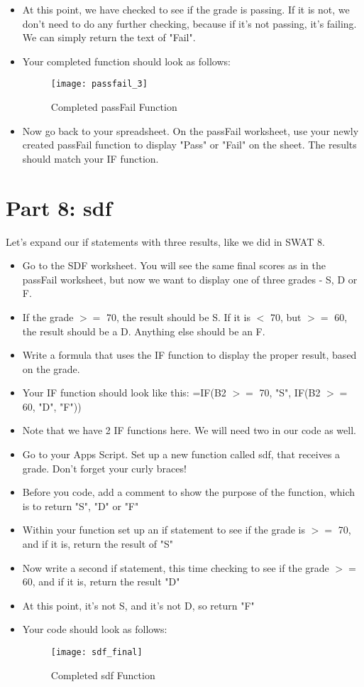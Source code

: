 \documentclass{article}
\begin{document}
\begin{itemize}
\item At this point, we have checked to see if the grade is passing.  If it is not, we don't need to do any further checking, because if it's not passing, it's failing.  We can simply return the text of "Fail".
  \item Your completed function should look as follows:
  \begin{figure}[H]
  \centering
  \texttt{[image: passfail\_3]}
  \caption{Completed passFail Function} 
\end{figure}
	\item Now go back to your spreadsheet.  On the passFail worksheet, use your newly created passFail function to display "Pass" or "Fail" on the sheet.  The results should match your IF function.
\end{itemize}

\section*{Part 8: sdf}
Let's expand our if statements with three results, like we did in SWAT 8.
\begin{itemize}
	\item Go to the SDF worksheet.  You will see the same final scores as in the passFail worksheet, but now we want to display one of three grades - S, D or F.
	\item If the grade $>=$ 70, the result should be S.  If it is $<$ 70, but $>=$ 60, the result should be a D.  Anything else should be an F.
	\item Write a formula that uses the IF function to display the proper result, based on the grade.  
	\item Your IF function should look like this:  =IF(B2 $>=$ 70, "S", IF(B2 $>=$ 60, "D", "F"))
	\item Note that we have 2 IF functions here.  We will need two in our code as well.
	\item Go to your Apps Script.  Set up a new function called sdf, that receives a grade.  Don't forget your curly braces!
	\item Before you code, add a comment to show the purpose of the function, which is to return "S", "D" or "F"
	\item Within your function set up an if statement to see if the grade is $>=$ 70, and if it is, return the result of "S"
	\item Now write a second if statement, this time checking to see if the grade $>=$ 60, and if it is, return the result "D"
	\item At this point, it's not S, and it's not D, so return "F"
	\item Your code should look as follows:
	\begin{figure}[H]
  \centering
  \texttt{[image: sdf\_final]}
  \caption{Completed sdf Function} 
\end{figure}
\end{itemize}
\end{document}
